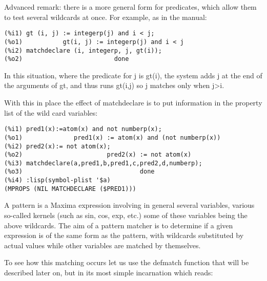 \documentclass[a4paper,11pt]{article}
\begin{document}
Advanced remark: there is a more general form for predicates, which allow them
to test several wildcards at once. For example, as in the manual:
\begin{verbatim}
(%i1) gt (i, j) := integerp(j) and i < j;
(%o1)           gt(i, j) := integerp(j) and i < j
(%i2) matchdeclare (i, integerp, j, gt(i));
(%o2)                         done
\end{verbatim}

In this situation, where the predicate for j is gt(i), the system adds j at the
end of the arguments of gt, and thus runs gt(i,j) so j matches only when
j>i. 


With this in place the effect of matchdeclare is to put information
in the property list of the wild card variables:
\begin{verbatim}
(%i1) pred1(x):=atom(x) and not numberp(x);
(%o1)              pred1(x) := atom(x) and (not numberp(x))
(%i2) pred2(x):= not atom(x);
(%o2)                       pred2(x) := not atom(x)
(%i3) matchdeclare(a,pred1,b,pred1,c,pred2,d,numberp);
(%o3)                                done
(%i4) :lisp(symbol-plist '$a) 
(MPROPS (NIL MATCHDECLARE ($PRED1)))
\end{verbatim}

A pattern is a Maxima expression involving in general several
variables, various so-called kernels (such as sin, cos, exp, etc.)
some of these variables being the above wildcards. The aim of a
pattern matcher is to determine if a given expression is of the same
form as the pattern, with wildcards substituted by actual values
while other variables are matched by themselves.


To see how this matching occurs let us use the defmatch function that
will be described later on, but in its most simple incarnation which
reads:
\end{document}

